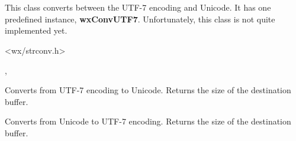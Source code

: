 %
%

\section{}\label{wxmbconvutf7}

This class converts between the UTF-7 encoding and Unicode.
It has one predefined instance, {\bf wxConvUTF7}.
Unfortunately, this class is not quite implemented yet.




<wx/strconv.h>


, 


\label{wxmbconvutf7mb2wc}


Converts from UTF-7 encoding to Unicode. Returns the size of the destination buffer.

\label{wxmbconvutf7wc2mb}


Converts from Unicode to UTF-7 encoding. Returns the size of the destination buffer.

